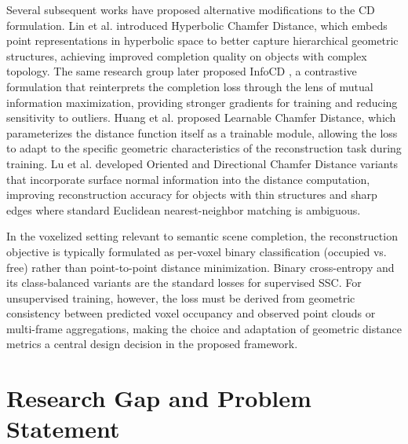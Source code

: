 \documentclass[a4paper, 12pt]{article}
\begin{document}
	Several subsequent works have proposed alternative modifications to the CD
	formulation. Lin et al. \cite{Lin_2023_ICCV} introduced Hyperbolic Chamfer
	Distance, which embeds point representations in hyperbolic space to better
	capture hierarchical geometric structures, achieving improved completion
	quality on objects with complex topology. The same research group later
	proposed InfoCD \cite{NEURIPS2023_f2ea1943}, a contrastive formulation that
	reinterprets the completion loss through the lens of mutual information
	maximization, providing stronger gradients for training and reducing
	sensitivity to outliers. Huang et al. \cite{HUANG202443} proposed Learnable
	Chamfer Distance, which parameterizes the distance function itself as a
	trainable module, allowing the loss to adapt to the specific geometric
	characteristics of the reconstruction task during training. Lu et al.
	\cite{9785649} developed Oriented and Directional Chamfer Distance variants
	that incorporate surface normal information into the distance computation,
	improving reconstruction accuracy for objects with thin structures and sharp
	edges where standard Euclidean nearest-neighbor matching is ambiguous.
	
	In the voxelized setting relevant to semantic scene completion, the
	reconstruction objective is typically formulated as per-voxel binary
	classification (occupied vs. free) rather than point-to-point distance
	minimization. Binary cross-entropy and its class-balanced variants are the
	standard losses for supervised SSC. For unsupervised training, however, the
	loss must be derived from geometric consistency between predicted voxel
	occupancy and observed point clouds or multi-frame aggregations, making the
	choice and adaptation of geometric distance metrics a central design decision
	in the proposed framework.
	
	\section{Research Gap and Problem Statement}
	
\end{document}
